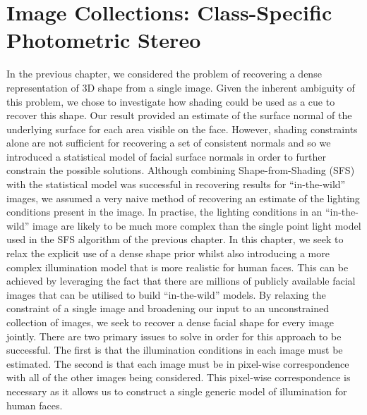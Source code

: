 \chapter{Image Collections: Class-Specific Photometric Stereo}\label{ch:imag_coll}
\minitoc{}
In the previous chapter, we considered the problem of recovering a dense
representation of 3D shape from a single image. Given the inherent
ambiguity of this problem, we chose to investigate how shading could be used as
a cue to recover this shape. Our result provided an estimate of the surface
normal of the underlying surface for each area visible on the face.
However, shading constraints alone are not
sufficient for recovering a set of consistent normals and so we introduced
a statistical model of facial surface normals in order to further constrain
the possible solutions. Although combining Shape-from-Shading (SFS) with the
statistical model was successful in recovering results for ``in-the-wild''
images, we assumed a very naive method of recovering an estimate of the
lighting conditions present in the image. In practise, the lighting conditions
in an ``in-the-wild'' image are likely to be much more complex than
the single point light model used in the SFS algorithm of the previous chapter.
In this chapter, we seek to relax the explicit use of a dense shape prior whilst
also introducing a more complex illumination model that is more realistic
for human faces. This can be achieved by leveraging the fact that there are
millions of publicly available facial images that can be utilised to build
``in-the-wild'' models. By relaxing the constraint of a single image and
broadening our input to an unconstrained collection of images, we seek
to recover a dense facial shape for every image jointly. There are two
primary issues to solve in order for this approach to be successful. The
first is that the illumination conditions in each image must be estimated.
The second is that each image must be in pixel-wise correspondence with all of
the other images being considered. This pixel-wise correspondence is necessary
as it allows us to construct a single generic model of illumination for human
faces.

